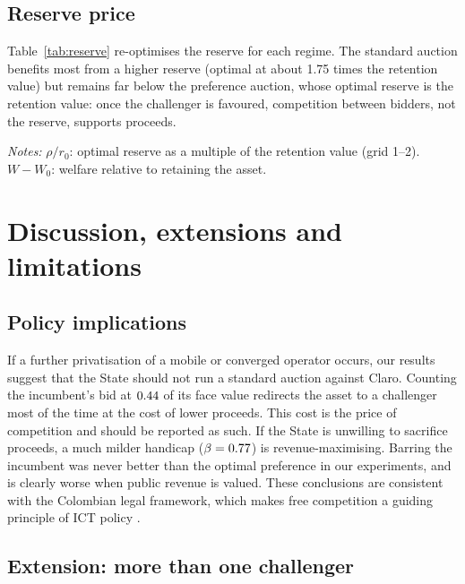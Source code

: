 \documentclass[12pt,a4paper]{article}
\theoremstyle{definition}
\theoremstyle{remark}
\begin{document}
\subsection{Reserve price}

Table~\ref{tab:reserve} re-optimises the reserve for each regime. The standard auction benefits most from a higher reserve (optimal at about 1.75 times the retention value) but remains far below the preference auction, whose optimal reserve is the retention value: once the challenger is favoured, competition between bidders, not the reserve, supports proceeds.

\begin{table}[!htbp]
\centering\small
\caption{Optimal reserve by regime (baseline; US\$ million)}\label{tab:reserve}

\par\vspace{2pt}\footnotesize\textit{Notes:} $\rho/r_0$: optimal reserve as a multiple of the retention value (grid 1--2). $W-W_0$: welfare relative to retaining the asset.
\end{table}

\section{Discussion, extensions and limitations}\label{sec:discussion}

\subsection{Policy implications}

If a further privatisation of a mobile or converged operator occurs, our results suggest that the State should not run a standard auction against Claro. Counting the incumbent's bid at $0.44$ of its face value redirects the asset to a challenger most of the time at the cost of lower proceeds. This cost is the price of competition and should be reported as such. If the State is unwilling to sacrifice proceeds, a much milder handicap ($\beta=0.77$) is revenue-maximising. Barring the incumbent was never better than the optimal preference in our experiments, and is clearly worse when public revenue is valued. These conclusions are consistent with the Colombian legal framework, which makes free competition a guiding principle of ICT policy \citep{ley1341,ley1978}.

\subsection{Extension: more than one challenger}\label{sec:multi}
\end{document}
